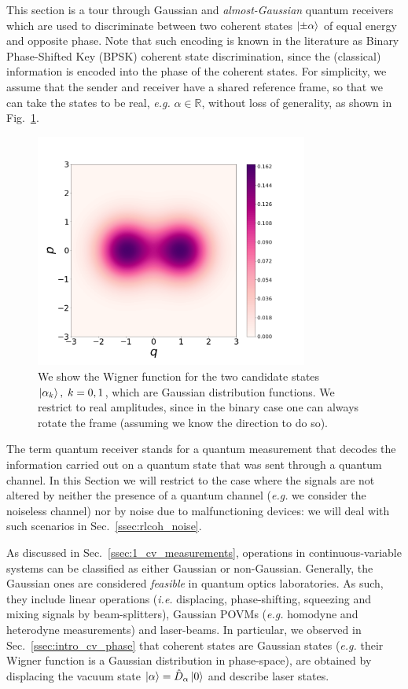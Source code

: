 This section is a tour through Gaussian and \textit{almost-Gaussian} quantum receivers which are used to discriminate between two coherent states $\ket{\pm \alpha}$ of equal energy and opposite phase. Note that such encoding is known in the literature as Binary Phase-Shifted Key (BPSK) coherent state discrimination, since the (classical) information is encoded into the phase of the coherent states. For simplicity, we assume that the sender and receiver have a shared reference frame, so that we can take the states to be real, \textit{e.g.} $\alpha\in\mathbb{R}$, without loss of generality, as shown in Fig.~\ref{fig:300coh}.
\begin{figure}[t!]
    \centering
    \includegraphics[width=0.8\textwidth]{Figures/some_wigners/bpshcoh.png}
    \caption{We show the Wigner function for the two candidate states $\ket{\alpha_k}, \; k=0,1$, which are Gaussian distribution functions. We restrict to real amplitudes, since in the binary case one can always rotate the frame (assuming we know the direction to do so).}
    \label{fig:300coh}
\end{figure}
The term quantum receiver stands for a quantum measurement that decodes the information carried out on a quantum state that was sent through a quantum channel. In this Section we will restrict to the case where the signals are not altered by neither the presence of a quantum channel (\textit{e.g.} we consider the noiseless channel) nor by noise due to malfunctioning devices: we will deal with such scenarios in Sec.~\ref{ssec:rlcoh_noise}.

As discussed in Sec.~\ref{ssec:1_cv_measurements}, operations in continuous-variable systems can be classified as either Gaussian or non-Gaussian. Generally, the Gaussian ones are considered \textit{feasible} in quantum optics laboratories. As such, they include linear operations (\textit{i.e.} displacing, phase-shifting, squeezing and mixing signals by beam-splitters), Gaussian POVMs (\textit{e.g.} homodyne and heterodyne measurements) and laser-beams. In particular, we observed in Sec.~\ref{ssec:intro_cv_phase} that coherent states are Gaussian states (\textit{e.g.} their Wigner function is a Gaussian distribution in phase-space), are obtained by displacing the vacuum state $\ket{\alpha} = \weyl{\alpha}\ket{0}$ and describe laser states.

